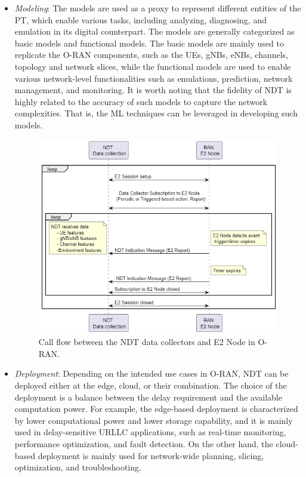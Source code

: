 \documentclass[]{IEEEtran}
\begin{document}
\begin{itemize}
	\item \emph{Modeling}: The models are used as a proxy to represent different entities of the PT, which enable various tasks, including analyzing, diagnosing, and emulation in its digital counterpart.  The models are generally categorized as basic models and functional models. The basic models are mainly used to replicate the O-RAN components, such as the UEs, gNBs, eNBs, channels, topology and network slices, while the functional models are used to enable various network-level functionalities such as emulations, prediction, network management, and monitoring. It is worth noting that the fidelity of NDT is highly related to the accuracy of such models to capture the network complexities. That is, the ML techniques can be leveraged in developing such models.
	\begin{figure}[ht]
		\centering
		\includegraphics[width=.95\linewidth]{NDT_E2}
		\caption{Call flow between the NDT data collectors and E2 Node in O-RAN. }
		\label{fig:NDT_E2}
	\end{figure} 
	\item \emph{Deployment}: Depending on the intended use cases in O-RAN, NDT can be deployed either at the edge, cloud, or their combination. The choice of the deployment is a balance between the  delay requirement and the available computation power. For example, the edge-based deployment is characterized by lower computational power and lower storage capability, and it is mainly used in delay-sensitive URLLC applications, such as real-time monitoring, performance optimization, and fault detection. On the other hand, the cloud-based deployment is  mainly used for network-wide planning, slicing, optimization, and troubleshooting.
\end{itemize}
\end{document}
